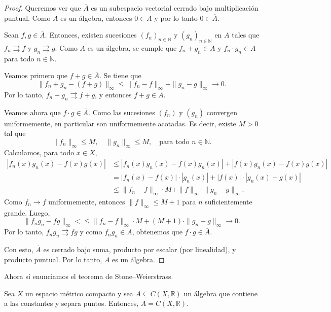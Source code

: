 \begin{proof}
	Queremos ver que $\overline{A}$ es un subespacio vectorial cerrado bajo multiplicación puntual. Como $A$ es un álgebra, entonces $0 \in A$ y por lo tanto $0 \in \overline{A}$.

	Sean $f, g \in \overline{A}$. Entonces, existen sucesiones $(f_n)_{n \in \mathbb{N}}$ y $(g_n)_{n \in \mathbb{N}}$ en $A$ tales que $f_n \rightrightarrows f$ y $g_n \rightrightarrows g$. Como $A$ es un álgebra, se cumple que $f_n + g_n \in A$ y $f_n \cdot g_n \in A$ para todo $n \in \mathbb{N}$.

	Veamos primero que $f + g \in \overline{A}$. Se tiene que
	\[
		\|f_n + g_n - (f + g)\|_\infty \leq \|f_n - f\|_\infty + \|g_n - g\|_\infty \to 0.
	\]
	Por lo tanto, $f_n + g_n \rightrightarrows f + g$, y entonces $f + g \in \overline{A}$.

	Veamos ahora que $f \cdot g \in \overline{A}$. Como las sucesiones $(f_n)$ y $(g_n)$ convergen uniformemente, en particular son uniformemente acotadas. Es decir, existe $M > 0$ tal que
	\[
		\|f_n\|_\infty \leq M, \quad \|g_n\|_\infty \leq M, \quad \text{para todo } n \in \mathbb{N}.
	\]
	Calculamos, para todo $x \in X$,
	\begin{align*}
		|f_n(x)g_n(x) - f(x)g(x)| 
		&\leq |f_n(x)g_n(x) - f(x)g_n(x)| + |f(x)g_n(x) - f(x)g(x)| \\
		&= |f_n(x) - f(x)| \cdot |g_n(x)| + |f(x)| \cdot |g_n(x) - g(x)| \\
		&\leq \|f_n - f\|_\infty \cdot M + \|f\|_\infty \cdot \|g_n - g\|_\infty.
	\end{align*}
	Como $f_n \to f$ uniformemente, entonces $\|f\|_\infty \leq M + 1$ para $n$ suficientemente grande. Luego,
	\[
		\|f_n g_n - f g\|_\infty < \leq \|f_n - f\|_\infty \cdot M + (M + 1) \cdot \|g_n - g\|_\infty \to 0.
	\]
	Por lo tanto, $f_n g_n \rightrightarrows f g$ y como $f_n g_n \in A$, obtenemos que $f \cdot g \in \overline{A}$.

	Con esto, $\overline{A}$ es cerrado bajo suma, producto por escalar (por linealidad), y producto puntual. Por lo tanto, $\overline{A}$ es un álgebra.
\end{proof}

Ahora sí enunciamos el teorema de Stone--Weierstrass.

\begin{theorem}
	Sea $X$ un espacio métrico compacto y sea $A \subseteq C(X, \mathbb{R})$ un álgebra que contiene a las constantes y separa puntos. Entonces, $\overline{A} = C(X, \mathbb{R})$.
\end{theorem}

